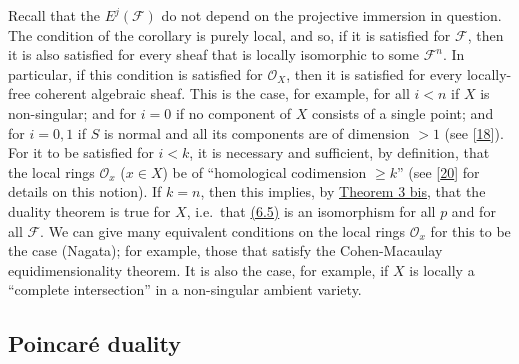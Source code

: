 \documentclass{article}
\theoremstyle{definition}
\theoremstyle{definition}
\theoremstyle{definition}
\theoremstyle{definition}
\theoremstyle{remark}
\begin{document}
Recall that the \(E^j({\mathscr{F}})\) do not depend on the projective immersion in question.
The condition of the corollary is purely local, and so, if it is satisfied for \({\mathscr{F}}\), then it is also satisfied for every sheaf that is locally isomorphic to some \({\mathscr{F}}^n\).
In particular, if this condition is satisfied for \({\mathscr{O}}_X\), then it is satisfied for every locally-free coherent algebraic sheaf.
This is the case, for example, for all \(i<n\) if \(X\) is non-singular;
and for \(i=0\) if no component of \(X\) consists of a single point;
and for \(i=0,1\) if \(S\) is normal and all its components are of dimension \(>1\) (see {[}\protect\hyperlink{ref-Ser1955}{18}{]}).
For it to be satisfied for \(i<k\), it is necessary and sufficient, by definition, that the local rings \({\mathscr{O}}_x\) (\(x\in X\)) be of ``homological codimension \(\geqslant k\)'' (see {[}\protect\hyperlink{ref-Ser1956a}{20}{]} for details on this notion).
If \(k=n\), then this implies, by \protect\hyperlink{fga-1-theorem-3bis}{Theorem 3 bis}, that the duality theorem is true for \(X\), i.e.~that \protect\hyperlink{fga-1-equation-6.5}{(6.5)} is an isomorphism for all \(p\) and for all \({\mathscr{F}}\).
We can give many equivalent conditions on the local rings \({\mathscr{O}}_x\) for this to be the case (Nagata);
for example, those that satisfy the Cohen-Macaulay equidimensionality theorem.
It is also the case, for example, if \(X\) is locally a ``complete intersection'' in a non-singular ambient variety.

\hypertarget{fga-1-section-7}{%
\subsection{Poincaré duality}\label{fga-1-section-7}}
\end{document}
